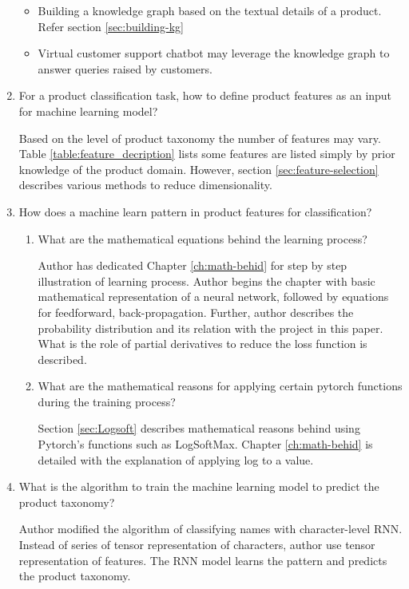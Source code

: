 \begin{enumerate}[label=\textbf{RQ\arabic*:}]
\begin{itemize}
        \item Building a knowledge graph based on the textual details of a product. Refer section \ref{sec:building-kg}
        \item Virtual customer support chatbot may leverage the knowledge graph to answer queries raised by customers.
    \end{itemize}
    
    \item For a product classification task, how to define product features as an input for machine learning model?
    
   Based on the level of product taxonomy the number of features may vary. Table \ref{table:feature_decription} lists some features are listed simply by prior knowledge of the product domain. However, section \ref{sec:feature-selection} describes various methods to reduce dimensionality.

    
    \item How does a machine learn pattern in product features for classification?
    

    \begin{enumerate}[label=\textbf{SRQ\arabic*:}]
        \item What are the mathematical equations behind the learning process?
    
        Author has dedicated Chapter \ref{ch:math-behid} for step by step illustration of learning process. Author begins the chapter with basic mathematical representation of a neural network, followed by equations for feedforward, back-propagation. Further, author describes the probability distribution and its relation with the project in this paper. What is the role of partial derivatives to reduce the loss function is described.  
        \item What are the mathematical reasons for applying certain pytorch functions during the training process? 
        
        Section \ref{sec:Logsoft} describes mathematical reasons behind using Pytorch's functions such as LogSoftMax. Chapter \ref{ch:math-behid} is detailed with the explanation of applying log to a value.         

    \end{enumerate}
    
    \item What is the algorithm to train the machine learning model to predict the product taxonomy?
        
    Author modified the algorithm of \parencite{sean}   classifying names with character-level RNN. Instead of series of tensor representation of characters, author use tensor representation of features. The RNN model learns the pattern and predicts the product taxonomy.

  \end{enumerate}

